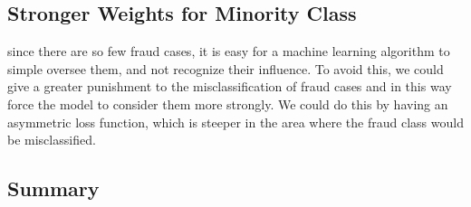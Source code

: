 \documentclass[utf8x]{ctexart}
\begin{document}
\subsection{Stronger Weights for Minority Class}

since there are so few fraud cases, it is easy for a machine learning algorithm to simple oversee them, and not recognize their influence. To avoid this, we could give a greater punishment to the misclassification of fraud cases and in this way force the model to consider them more strongly. We could do this by having an asymmetric loss function, which is steeper in the area where the fraud class would be misclassified.



\subsection{Summary}

\newpage
{}
\renewcommand\refname{Bibliography}


\end{document}
